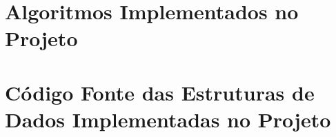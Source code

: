 \documentclass[a4paper,12pt]{article}
\begin{document}
\newpage
\appendix
\begin{appendices}


\label{App:AppendixA}
\chapter{Algoritmos Implementados no Projeto}
 











\chapter{Código Fonte das Estruturas de Dados Implementadas no Projeto}




\end{appendices}



\end{document}
